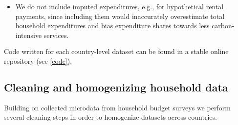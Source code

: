 \documentclass[12pt, a4paper]{article}
\begin{document}
\begin{itemize}
    \item We do not include imputed expenditures, e.g., for hypothetical rental payments, since including them would inaccurately overestimate total household expenditures and bias expenditure shares towards less carbon-intensive services.
\end{itemize}

Code written for each country-level dataset can be found in a stable online repository (see \ref{code}).

\subsection{Cleaning and homogenizing household data}

Building on collected microdata from household budget surveys we perform several cleaning steps in order to homogenize datasets across countries.
\end{document}
